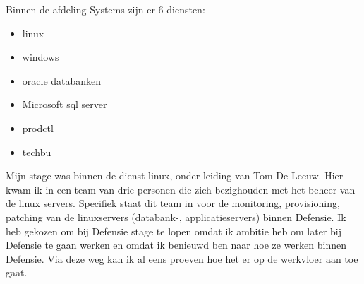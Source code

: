 Binnen de afdeling Systems zijn er 6 diensten:

\begin{itemize}
    \item linux
    \item windows
    \item oracle databanken
    \item Microsoft sql server
    \item prodctl
    \item techbu
\end{itemize}

Mijn stage was binnen de dienst linux, onder leiding van Tom De Leeuw. Hier kwam ik in een team van drie personen die zich bezighouden met het beheer van de linux servers. Specifiek staat dit team in voor de monitoring, provisioning, patching van de linuxservers (databank-, applicatieservers) binnen Defensie.
Ik heb gekozen om bij Defensie stage te lopen omdat ik ambitie heb om later bij Defensie te gaan werken en omdat ik benieuwd ben naar hoe ze werken binnen Defensie. Via deze weg kan ik al eens proeven hoe het er op de werkvloer aan toe gaat.
